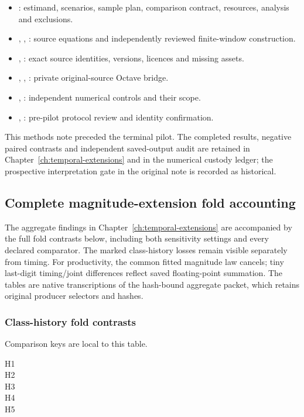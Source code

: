 \begin{itemize}
\item {}: estimand, scenarios, sample plan, comparison contract, resources, analysis and exclusions.
\item {}, , : source equations and independently reviewed finite-window construction.
\item {}, : exact source identities, versions, licences and missing assets.
\item {}, , : private original-source Octave bridge.
\item {}, : independent numerical controls and their scope.
\item {}, : pre-pilot protocol review and identity confirmation.
\end{itemize}

This methods note preceded the terminal pilot. The completed results, negative paired contrasts and independent saved-output audit are retained in Chapter~\ref{ch:temporal-extensions} and in the numerical custody ledger; the prospective interpretation gate in the original note is recorded as historical.

\subsection{Complete magnitude-extension fold accounting}
\label{app:audit09-magnitude-folds}
The aggregate findings in Chapter~\ref{ch:temporal-extensions} are accompanied by the full fold contrasts below,
including both sensitivity settings and every declared comparator. The marked
class-history losses remain visible separately from timing. For productivity,
the common fitted magnitude law cancels; tiny last-digit timing/joint
differences reflect saved floating-point summation. The tables are native
transcriptions of the hash-bound aggregate packet, which retains original
producer selectors and hashes.

\subsubsection{Class-history fold contrasts}
Comparison keys are local to this table. 
\begin{description}
\item[H1] 
\item[H2] 
\item[H3] 
\item[H4] 
\item[H5] 
\end{description}

